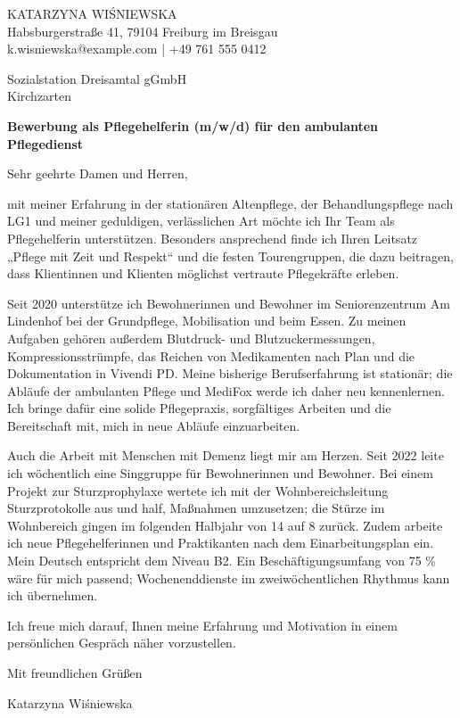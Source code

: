 \documentclass[11pt,a4paper]{article}
\begin{document}
KATARZYNA WIŚNIEWSKA\\
Habsburgerstraße 41, 79104 Freiburg im Breisgau\\
k.wisniewska@example.com | +49 761 555 0412

Sozialstation Dreisamtal gGmbH\\
Kirchzarten

\textbf{Bewerbung als Pflegehelferin (m/w/d) für den ambulanten Pflegedienst}

Sehr geehrte Damen und Herren,

mit meiner Erfahrung in der stationären Altenpflege, der Behandlungspflege nach LG1 und meiner geduldigen, verlässlichen Art möchte ich Ihr Team als Pflegehelferin unterstützen. Besonders ansprechend finde ich Ihren Leitsatz „Pflege mit Zeit und Respekt“ und die festen Tourengruppen, die dazu beitragen, dass Klientinnen und Klienten möglichst vertraute Pflegekräfte erleben.

Seit 2020 unterstütze ich Bewohnerinnen und Bewohner im Seniorenzentrum Am Lindenhof bei der Grundpflege, Mobilisation und beim Essen. Zu meinen Aufgaben gehören außerdem Blutdruck- und Blutzuckermessungen, Kompressionsstrümpfe, das Reichen von Medikamenten nach Plan und die Dokumentation in Vivendi PD. Meine bisherige Berufserfahrung ist stationär; die Abläufe der ambulanten Pflege und MediFox werde ich daher neu kennenlernen. Ich bringe dafür eine solide Pflegepraxis, sorgfältiges Arbeiten und die Bereitschaft mit, mich in neue Abläufe einzuarbeiten.

Auch die Arbeit mit Menschen mit Demenz liegt mir am Herzen. Seit 2022 leite ich wöchentlich eine Singgruppe für Bewohnerinnen und Bewohner. Bei einem Projekt zur Sturzprophylaxe wertete ich mit der Wohnbereichsleitung Sturzprotokolle aus und half, Maßnahmen umzusetzen; die Stürze im Wohnbereich gingen im folgenden Halbjahr von 14 auf 8 zurück. Zudem arbeite ich neue Pflegehelferinnen und Praktikanten nach dem Einarbeitungsplan ein. Mein Deutsch entspricht dem Niveau B2. Ein Beschäftigungsumfang von 75 \% wäre für mich passend; Wochenenddienste im zweiwöchentlichen Rhythmus kann ich übernehmen.

Ich freue mich darauf, Ihnen meine Erfahrung und Motivation in einem persönlichen Gespräch näher vorzustellen.

Mit freundlichen Grüßen

Katarzyna Wiśniewska
\end{document}
